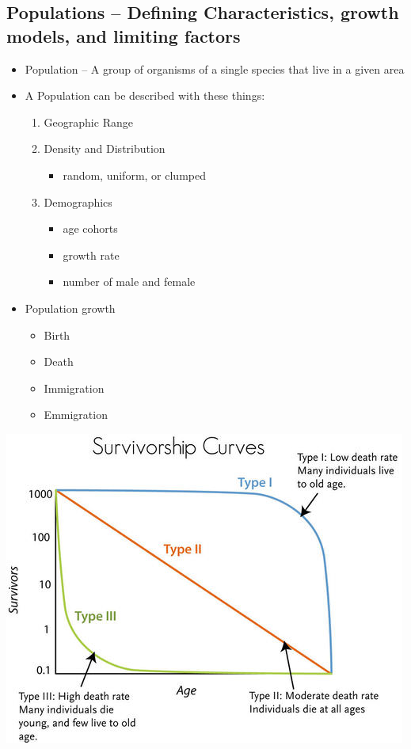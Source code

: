 \documentclass{article}
\begin{document}
\subsection{Populations -- Defining Characteristics, growth models, and limiting factors}
\begin{itemize}
\item Population -- A group of organisms of a single species that live in a given area
\item A Population can be described with these things:
\begin{enumerate}
\item Geographic Range
\item Density and Distribution
\begin{itemize}
\item random, uniform, or clumped
\end{itemize}
\item Demographics
\begin{itemize}
\item age cohorts
\item growth rate
\item number of male and female
\end{itemize}
\end{enumerate}

\item Population growth
\begin{itemize}
\item Birth
\item Death
\item Immigration
\item Emmigration
\end{itemize}
\end{itemize}

\includegraphics[scale=1.5]{ssc}
\end{document}

